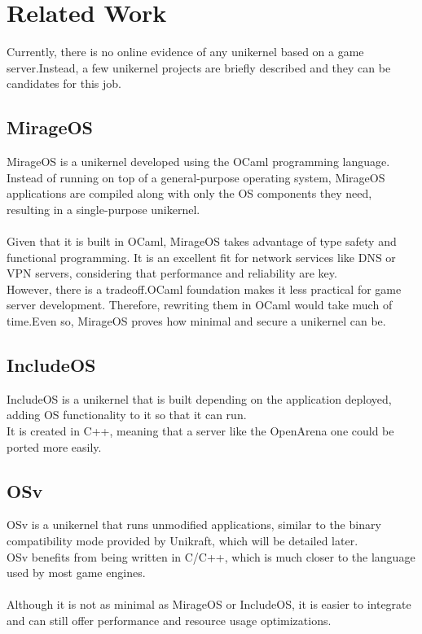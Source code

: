 \chapter{Related Work}
\label{chapter:soa&rw}
Currently, there is no online evidence of any unikernel based on a game server.\@ Instead, a few unikernel projects are briefly described and they
can be candidates for this job.
\section{MirageOS}
MirageOS\cite{mirageio} is a unikernel developed using the OCaml programming language.
Instead of running on top of a general-purpose operating system, MirageOS applications are compiled along with only the OS components they need, resulting in a single-purpose unikernel. \\ \\
Given that it is built in OCaml, MirageOS takes advantage of type safety and functional programming.
It is an excellent fit for network services like DNS or VPN servers, considering that performance and reliability are key. \\
However, there is a tradeoff.\@ OCaml foundation makes it less practical for game server development.\@
Therefore, rewriting them in OCaml would take much of time.\@ Even so, MirageOS proves how minimal and secure a unikernel can be.
\section{IncludeOS}
IncludeOS\cite{includeos} is a unikernel that is built depending on the application deployed, adding
OS functionality to it so that it can run. \\
It is created in C++, meaning that a server like the OpenArena one could be ported more easily.
\section{OSv}
OSv\cite{osv} is a unikernel that runs unmodified applications, similar to the binary compatibility mode provided by Unikraft, which will be detailed later. \\
OSv benefits from being written in C/C++, which is much closer to the language used by most game engines. \\ \\
Although it is not as minimal as MirageOS or IncludeOS, it is easier to integrate and can still offer performance and resource usage optimizations.